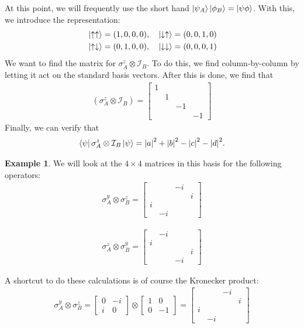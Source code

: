 \documentclass{book}
\theoremstyle{definition}
\newtheorem{exmp}{Example}[section]
\newcommand{\nn}{\nonumber}
\newcommand{\Id}{\mathcal{I}}
\begin{document}
At this point, we will frequently use the short hand $\ket{\psi_A}\ket{\phi_B} = \ket{\psi\phi}$. With this, we introduce the representation:
\begin{align}
&\ket{\uparrow\uparrow} = (1,0,0,0), \quad \ket{\downarrow\uparrow} = (0,0,1,0)\nn\\
&\ket{\uparrow\downarrow} = (0,1,0,0), \quad \ket{\downarrow\downarrow} = (0,0,0,1)
\end{align}
We want to find the matrix for $\sigma^z_A \otimes  \Id_B$. To do this, we find column-by-column by letting it act on the standard basis vectors. After this is done, we find that 
\begin{align}
(\sigma_A^z \otimes \Id_B) = \begin{bmatrix}
1 &&&\\
& 1 && \\
&&-1&\\
&&&-1
\end{bmatrix}
\end{align}
Finally, we can verify that
\begin{align}
\bra{\psi} \sigma^z_A \otimes \Id_B \ket{\psi} = \abs{a}^2 + \abs{b}^2 - \abs{c}^2 - \abs{d}^2.
\end{align}


\begin{exmp}
	We will look at the $4\times 4$ matrices in this basis for the following operators:
	\begin{align}
	\sigma_A^y \otimes \sigma_B^z = \begin{bmatrix}
	&&-i&\\
	&&&i\\
	i&&&\\
	&-i&&
	\end{bmatrix}
	\end{align}
	
	\begin{align}
	\sigma^z_A \otimes \sigma^y_B = \begin{bmatrix}
	&-i&& \\
	i&&&\\
	&&&i\\
	&&-i&
	\end{bmatrix}
	\end{align}
\end{exmp}

A shortcut to do these calculations is of course the Kronecker product:
\begin{align}
\sigma_A^y \otimes \sigma_B^z = 
\begin{bmatrix}
0 & -i \\ i & 0
\end{bmatrix} \otimes \begin{bmatrix}
1 & 0 \\ 0 & -1
\end{bmatrix}
=\begin{bmatrix}
&&-i&\\
&&&i\\
i&&&\\
&-i&&
\end{bmatrix}
\end{align}
\end{document}

